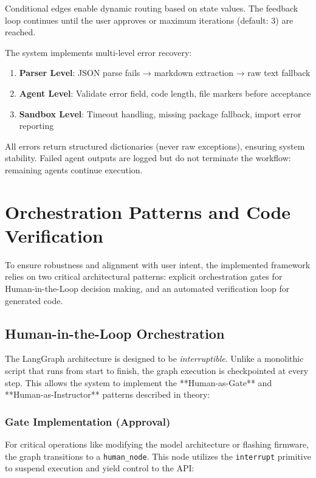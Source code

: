 Conditional edges enable dynamic routing based on state values. The feedback loop continues until the user approves or maximum iterations (default: 3) are reached.


The system implements multi-level error recovery:

\begin{enumerate}
  \item \textbf{Parser Level}: JSON parse fails → markdown extraction → raw text fallback
  \item \textbf{Agent Level}: Validate error field, code length, file markers before acceptance
  \item \textbf{Sandbox Level}: Timeout handling, missing package fallback, import error reporting
\end{enumerate}

All errors return structured dictionaries (never raw exceptions), ensuring system stability. Failed agent outputs are logged but do not terminate the workflow: remaining agents continue execution.

\section{Orchestration Patterns and Code Verification}

To ensure robustness and alignment with user intent, the implemented framework relies on two critical architectural patterns: explicit orchestration gates for Human-in-the-Loop decision making, and an automated verification loop for generated code.

\subsection{Human-in-the-Loop Orchestration}

The LangGraph architecture is designed to be \textit{interruptible}. Unlike a monolithic script that runs from start to finish, the graph execution is checkpointed at every step. This allows the system to implement the **Human-as-Gate** and **Human-as-Instructor** patterns described in theory:

\subsubsection{Gate Implementation (Approval)}
For critical operations like modifying the model architecture or flashing firmware, the graph transitions to a \texttt{human\_node}. This node utilizes the \texttt{interrupt} primitive to suspend execution and yield control to the API:

